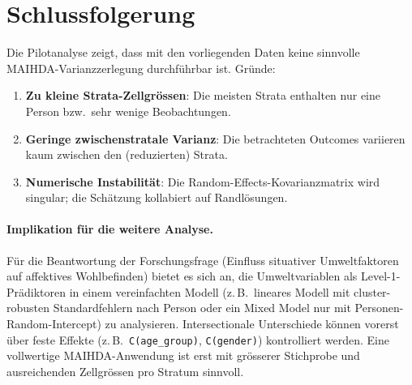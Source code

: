 \section{Schlussfolgerung}
Die Pilotanalyse zeigt, dass mit den vorliegenden Daten keine sinnvolle MAIHDA-Varianzzerlegung durchführbar ist. Gründe:
\begin{enumerate}
    \item \textbf{Zu kleine Strata-Zellgrössen}: Die meisten Strata enthalten nur eine Person bzw.\ sehr wenige Beobachtungen.
    \item \textbf{Geringe zwischenstratale Varianz}: Die betrachteten Outcomes variieren kaum zwischen den (reduzierten) Strata.
    \item \textbf{Numerische Instabilität}: Die Random-Effects-Kovarianzmatrix wird singular; die Schätzung kollabiert auf Randlösungen.
\end{enumerate}

\paragraph{Implikation für die weitere Analyse.}
Für die Beantwortung der Forschungsfrage (Einfluss situativer Umweltfaktoren auf affektives Wohlbefinden) bietet es sich an, die Umweltvariablen als Level-1-Prädiktoren in einem vereinfachten Modell (z.\,B.\ lineares Modell mit cluster-robusten Standardfehlern nach Person oder ein Mixed Model nur mit Personen-Random-Intercept) zu analysieren. Intersectionale Unterschiede können vorerst über feste Effekte (z.\,B.\ \texttt{C(age\_group)}, \texttt{C(gender)}) kontrolliert werden. Eine vollwertige MAIHDA-Anwendung ist erst mit grösserer Stichprobe und ausreichenden Zellgrössen pro Stratum sinnvoll.



